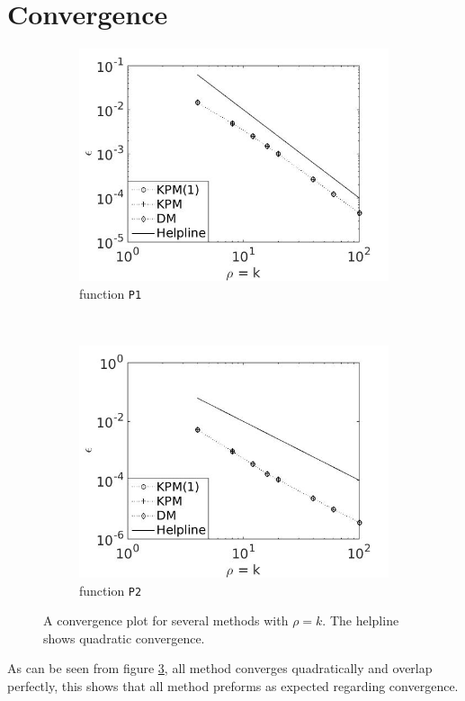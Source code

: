 \section{Convergence} \label{sec:sconv}
\begin{figure}[H]
        \centering
        \begin{subfigure}[b]{0.45\textwidth}
                \includegraphics[width=\textwidth]{fig/s1conv1}
                \caption{function \texttt{P1}}
                \label{fig:conv1}
        \end{subfigure}%
~
        \begin{subfigure}[b]{0.45\textwidth}
                \includegraphics[width=\textwidth]{fig/s2conv2}
                \caption{function \texttt{P2}}
                \label{fig:conv2}
        \end{subfigure}
        \caption{A convergence plot for several methods with $\rho = k$. The helpline shows quadratic convergence.}\label{fig:conv}
\end{figure}
As can be seen from figure \ref{fig:conv}, all method converges quadratically and overlap perfectly, this shows that all method preforms as expected regarding convergence.
